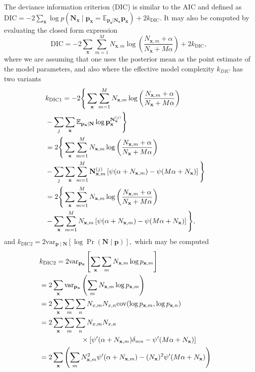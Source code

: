 \documentclass{IOS-Book-Article}
\newcommand{\bN}{\mathbf{N}}
\newcommand{\bx}{\mathbf{x}}
\newcommand{\bp}{\mathbf{p}}
\newcommand{\var}{\mathrm{var}}
\newcommand{\cov}{\mathrm{cov}}
\begin{document}
 The deviance information criterion (DIC) is similar to the AIC and defined as 
$\textrm{DIC} = -2\sum_{\bx}\log p\left(\bN_{\bx} \mid \bp_{\bx} = \mathbb{E}_{\bp_{\bx}\vert \bN_\bx}  \bp_{\bx}   \right) + 2k_{\textrm{DIC}}.$ It may also be computed by evaluating the closed form expression
\begin{equation}
\textrm{DIC} =-2\sum_{\bx}\sum_{m=1}^M N_{\bx,m}\log \left( \frac{N_{\bx,m} +\alpha}{N_\bx+ M\alpha}  \right)+  2k_{\textrm{DIC}},
\end{equation}
where we are assuming that one uses the posterior mean as the point estimate of the model parameters, and also where the effective model complexity $k_{DIC}$ has two variants
 \begin{align}
\lefteqn{ k_{\textrm{DIC1}}= -2\Bigg\{ \sum_{\bx}\sum_{m=1}^M N_{\bx,m}\log \left( \frac{N_{\bx,m} +\alpha}{N_\bx+ M\alpha}  \right)   } \nonumber\\
 & -\sum_j \sum_\bx \mathbb{E}_{\bp_\bx\vert\bN}\log\bp_\bx^{\bN_{\bx}^{(j)}} \Bigg\} \nonumber\\
 &=2\Bigg\{ \sum_{\bx}\sum_{m=1}^M N_{\bx,m}\log \left( \frac{N_{\bx,m} +\alpha}{N_\bx+ M\alpha}  \right)   \nonumber\\
 & -\sum_j \sum_\bx \sum_{m=1}^M {\bN_{\bx,m}^{(j)}}  \left[ \psi(\alpha+N_{\bx,m}) - \psi(M\alpha+N_{\bx}) \right] \Bigg\} \nonumber\\
  &=2\Bigg\{ \sum_{\bx}\sum_{m=1}^M N_{\bx,m}\log \left( \frac{N_{\bx,m} +\alpha}{N_\bx+ M\alpha}  \right)   \nonumber\\
 & - \sum_\bx \sum_{m=1}^M {N_{\bx,m} }  \left[ \psi(\alpha+N_{\bx,m}) - \psi(M\alpha+N_{\bx}) \right] \Bigg\} ,\nonumber\\
  \end{align}
  and $k_{\textrm{DIC2}} = 2\textrm{var}_{\bp\mid\bN}\left[ \log \Pr\left( \bN\mid \bp\right) \right] ,$ which may be computed
 \begin{align}
\lefteqn{k_{\textrm{DIC2}} =2 \var_{\bp_\bx}\left[ \sum_{\bx}\sum_{m} N_{\bx,m} \log p_{\bx,m}  \right] }\nonumber \\
&=2\sum_{\bx} \var_{\bp_\bx}\left( \sum_{m} N_{\bx,m} \log p_{\bx,m} \right) \nonumber\\
&=2\sum_{\bx} \sum_{m}\sum_{n} N_{x,m}N_{x,n} \cov(\log p_{\bx,m},\log p_{\bx,n}) \nonumber\\
&=2\sum_{\bx} \sum_m\sum_n N_{x,m}N_{x,n} \nonumber\\
&\qquad\qquad\qquad\times\left[ \psi^\prime(\alpha+N_{\bx,m})\delta_{mn} - \psi^\prime(M\alpha+N_{\bx})  \right] \nonumber\\
&=2\sum_{\bx} \left(\sum_m N_{\bx,m}^2 \psi^\prime(\alpha+N_{\bx,m})  - (N_{\bx})^2  \psi^\prime(M\alpha+N_{\bx}) \right)
\end{align}
\end{document}
